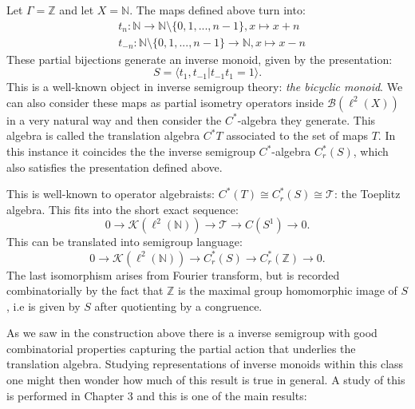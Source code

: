 \begin{example}\label{Ex:Int2}
Let $\Gamma=\mathbb{Z}$ and let $X=\mathbb{N}$. The maps defined above turn into:
\begin{eqnarray*}
& t_{n}: \mathbb{N} \rightarrow \mathbb{N}\setminus \lbrace 0,1,...,n-1 \rbrace, x \mapsto x+n \\
&t_{-n}: \mathbb{N}\setminus \lbrace 0,1,...,n-1 \rbrace \rightarrow \mathbb{N} , x \mapsto x-n
\end{eqnarray*} 
These partial bijections generate an inverse monoid, given by the presentation:
\begin{equation*}
S=\langle t_{1},t_{-1} | t_{-1}t_{1}=1 \rangle.
\end{equation*}
This is a well-known object in inverse semigroup theory: \textit{the bicyclic monoid}. We can also consider these maps as partial isometry operators inside $\mathcal{B}(\ell^{2}(X))$ in a very natural way and then consider the $C^{*}$-algebra they generate. This algebra is called the translation algebra $C^{*}T$ associated to the set of maps $T$. In this instance it coincides the the inverse semigroup $C^{*}$-algebra $C^{*}_{r}(S)$, which also satisfies the presentation defined above.

This is well-known to operator algebraists: $C^{*}(T)\cong C^{*}_{r}(S) \cong \mathcal{T}$: the Toeplitz algebra. This fits into the short exact sequence:
\begin{equation*}
0 \rightarrow \mathcal{K}(\ell^{2}(\mathbb{N})) \rightarrow \mathcal{T} \rightarrow C(S^{1}) \rightarrow 0.
\end{equation*}
This can be translated into semigroup language:
\begin{equation*}
0 \rightarrow \mathcal{K}(\ell^{2}(\mathbb{N})) \rightarrow C^{*}_{r}(S) \rightarrow C^{*}_{r}(\mathbb{Z}) \rightarrow 0.
\end{equation*}
The last isomorphism arises from Fourier transform, but is recorded combinatorially by the fact that $\mathbb{Z}$ is the maximal group homomorphic image of $S$, i.e is given by $S$ after quotienting by a congruence. 
\end{example}

As we saw in the construction above there is a inverse semigroup with good combinatorial properties capturing the partial action that underlies the translation algebra. Studying representations of inverse monoids within this class one might then wonder how much of this result is true in general. A study of this is performed in Chapter 3 and this is one of the main results:

